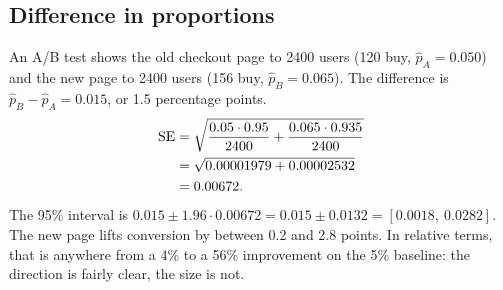 \subsection{Difference in proportions}

An A/B test shows the old checkout page to 2400 users (120 buy, $\hat p_A =
0.050$) and the new page to 2400 users (156 buy, $\hat p_B = 0.065$). The
difference is $\hat p_B - \hat p_A = 0.015$, or 1.5 percentage points.
\begin{align*}
  \operatorname{SE} &= \sqrt{\frac{0.05\cdot 0.95}{2400} + \frac{0.065\cdot 0.935}{2400}} \\
      &= \sqrt{0.00001979 + 0.00002532} \\
      &= 0.00672.
\end{align*}
The 95\% interval is $0.015 \pm 1.96\cdot 0.00672 = 0.015\pm 0.0132 =
[0.0018,\ 0.0282]$. The new page lifts conversion by between 0.2 and 2.8
points. In relative terms, that is anywhere from a 4\% to a 56\% improvement on the
5\% baseline: the direction is fairly clear, the size is not.

